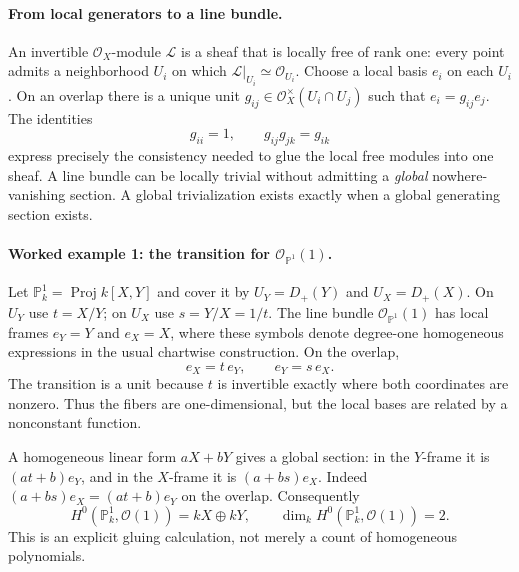 \paragraph{From local generators to a line bundle.}
An invertible $\mathcal O_X$-module $\mathcal L$ is a sheaf that is
locally free of rank one: every point admits a neighborhood $U_i$ on
which $\mathcal L|_{U_i}\simeq\mathcal O_{U_i}$.  Choose a local
basis $e_i$ on each $U_i$.  On an overlap there is a unique unit
$g_{ij}\in\mathcal O_X^\times(U_i\cap U_j)$ such that
$e_i=g_{ij}e_j$.  The identities
\[
 g_{ii}=1,\qquad g_{ij}g_{jk}=g_{ik}
\]
express precisely the consistency needed to glue the local free
modules into one sheaf.  A line bundle can be locally trivial
without admitting a \emph{global} nowhere-vanishing section.
A global trivialization exists exactly when a global generating
section exists.

\paragraph{Worked example 1: the transition for $\mathcal O_{\mathbb P^1}(1)$.}
Let $\mathbb P^1_k=\operatorname{Proj}k[X,Y]$ and cover it by
$U_Y=D_+(Y)$ and $U_X=D_+(X)$.  On $U_Y$ use $t=X/Y$;
on $U_X$ use $s=Y/X=1/t$.  The line bundle
$\mathcal O_{\mathbb P^1}(1)$ has local frames $e_Y=Y$ and
$e_X=X$, where these symbols denote degree-one homogeneous
expressions in the usual chartwise construction.  On the overlap,
\[
 e_X=t\,e_Y,\qquad e_Y=s\,e_X.
\]
The transition is a unit because $t$ is invertible exactly where
both coordinates are nonzero.  Thus the fibers are one-dimensional,
but the local bases are related by a nonconstant function.

A homogeneous linear form $aX+bY$ gives a global section: in the
$Y$-frame it is $(at+b)e_Y$, and in the $X$-frame it is
$(a+bs)e_X$.  Indeed $(a+bs)e_X=(at+b)e_Y$ on the overlap.
Consequently
\[
 H^0(\mathbb P^1_k,\mathcal O(1))
  =kX\oplus kY,\qquad \dim_k H^0(\mathbb P^1_k,\mathcal O(1))=2.
\]
This is an explicit gluing calculation, not merely a count of
homogeneous polynomials.

